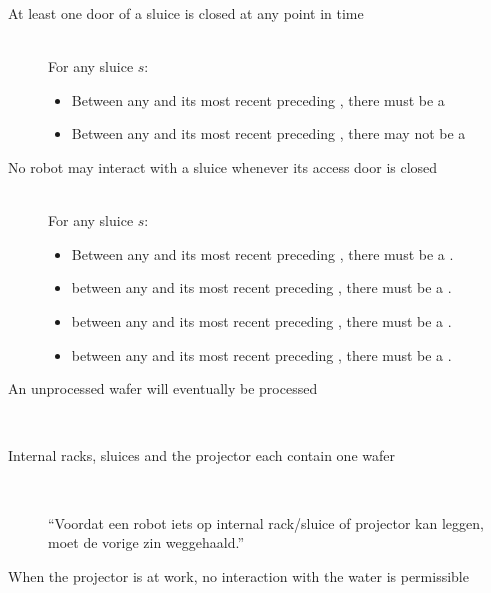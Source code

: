 
\begin{description}
 \item[At least one door of a sluice is closed at any point in time] \hfill \\
 For any sluice $s$:
 \begin{itemize}
  \item Between any  and its most recent preceding , there must be a 
  \item Between any  and its most recent preceding , there may not be a 
 \end{itemize}

 \item[No robot may interact with a sluice whenever its access door is closed] \hfill \\
For any sluice $s$:

\begin{itemize}
	\item Between any  and its most recent preceding , there must be a .
	\item between any  and its most recent preceding , there must be a .
	\item between any  and its most recent preceding , there must be a .
	\item between any  and its most recent preceding , there must be a .
\end{itemize}
 
 \item[An unprocessed wafer will eventually be processed] \hfill \\
 
 
 
 \item[Internal racks, sluices and the projector each contain one wafer] \hfill \\
 
 ``Voordat een robot iets op internal rack/sluice of projector kan leggen, moet de vorige zin weggehaald.''
 
 \item[When the projector is at work, no interaction with the water is permissible] \hfill \\
 

\end{description}
